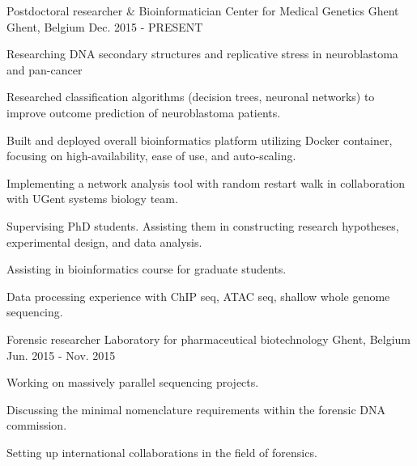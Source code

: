 

\begin{cventries}

  \cventry
    {Postdoctoral researcher \& Bioinformatician} %
    {Center for Medical Genetics Ghent} %
    {Ghent, Belgium} %
    {Dec. 2015 - PRESENT} %
    {
      \begin{cvitems} %
        \item {Researching DNA secondary structures and replicative
            stress in neuroblastoma and pan-cancer}
        \item {Researched classification algorithms (decision trees,
            neuronal networks) to improve outcome prediction of
            neuroblastoma patients.}
      \item {Built and deployed overall bioinformatics platform
          utilizing Docker container, focusing on high-availability,
          ease of use, and auto-scaling.}
      \item {Implementing a network analysis tool with random restart
          walk in collaboration with UGent systems biology team.}
      \item {Supervising PhD students. Assisting them in constructing
          research hypotheses, experimental design, and data
          analysis.}
      \item {Assisting in bioinformatics course for graduate
          students.}
      \item {Data processing experience with ChIP seq, ATAC seq,
          shallow whole genome sequencing.}
      \end{cvitems}
    }

  \cventry
    {Forensic researcher} %
    {Laboratory for pharmaceutical biotechnology} %
    {Ghent, Belgium} %
    {Jun. 2015 - Nov. 2015} %
    {
      \begin{cvitems} %
        \item {Working on massively parallel sequencing projects.}
        \item {Discussing the minimal nomenclature requirements within
          the forensic DNA commission.}
        \item {Setting up international collaborations in the field of forensics.}
      \end{cvitems}
    }


\end{cventries}
